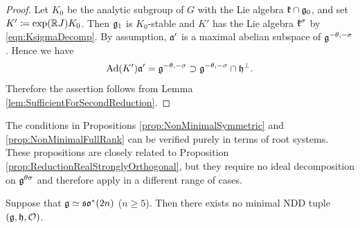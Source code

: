 \begin{proof}
	Let $K_0$ be the analytic subgroup of $G$ with the Lie algebra $\mathfrak{k}\cap \mathfrak{g}_0$, and set $K'\coloneq \exp(\mathbb{R} J)K_0$.
	Then $\mathfrak{g}_1$ is $K_0$-stable and $K'$ has the Lie algebra $\mathfrak{k}^\sigma$ by \eqref{eqn:KsigmaDecomp}.
	By assumption, $\mathfrak{a'}$ is a maximal abelian subspace of $\mathfrak{g}^{-\theta, -\sigma}$.
	Hence we have
	\begin{align*}
		\mathrm{Ad}(K')\mathfrak{a'} = \mathfrak{g}^{-\theta, -\sigma} \supset \mathfrak{g}^{-\theta, -\sigma} \cap \mathfrak{h}^\perp.
	\end{align*}
	Therefore the assertion follows from Lemma \ref{lem:SufficientForSecondReduction}.
\end{proof}

The conditions in Propositions \ref{prop:NonMinimalSymmetric} and \ref{prop:NonMinimalFullRank} can be verified purely in terms of root systems.
These propositions are closely related to Proposition \ref{prop:ReductionRealStronglyOrthogonal}, but they require no ideal decomposition on $\mathfrak{g}^{\theta\sigma}$ and therefore apply in a different range of cases.

\begin{lemma} \label{lem:NonMinimalSOstar}
	Suppose that $\mathfrak{g} \simeq \mathfrak{so}^*(2n)$ ($n \geq 5$).
	Then there exists no minimal NDD tuple $(\mathfrak{g}, \mathfrak{h}, \mathcal{O})$.
\end{lemma}

